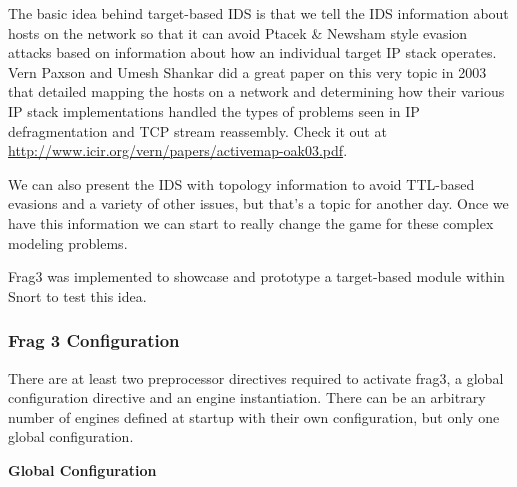 \documentclass[english]{report}
\begin{document}
The basic idea behind target-based IDS is that we tell the IDS information
about hosts on the network so that it can avoid Ptacek \& Newsham style evasion
attacks based on information about how an individual target IP stack operates.
Vern Paxson and Umesh Shankar did a great paper on this very topic in 2003 that
detailed mapping the hosts on a network and determining how their various IP
stack implementations handled the types of problems seen in IP defragmentation
and TCP stream reassembly.  Check it out at
\url{http://www.icir.org/vern/papers/activemap-oak03.pdf}.

We can also present the IDS with topology information to avoid TTL-based
evasions and a variety of other issues, but that's a topic for another day.
Once we have this information we can start to really change the game for these
complex modeling problems.

Frag3 was implemented to showcase and prototype a target-based module within
Snort to test this idea.

\subsubsection{Frag 3 Configuration}

There are at least two preprocessor directives required to activate frag3,
a global configuration directive and an engine instantiation.  There can
be an arbitrary number of engines defined at startup with their own
configuration, but only one global configuration.

\textbf{Global Configuration}
\end{document}
